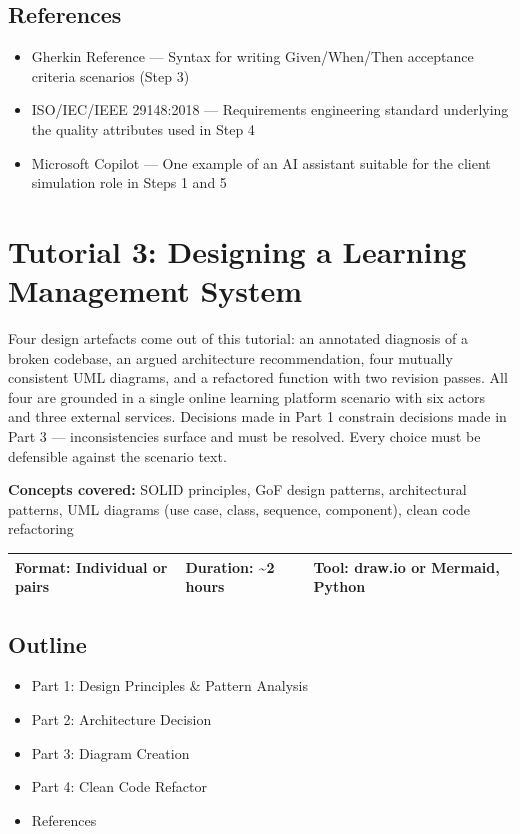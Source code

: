 \documentclass[11pt,a4paper]{book}
\begin{document}
\medskip

\section{References}

\begin{itemize}
  \item Gherkin Reference --- Syntax for writing Given/When/Then acceptance criteria scenarios (Step 3)
  \item ISO/IEC/IEEE 29148:2018 --- Requirements engineering standard underlying the quality attributes used in Step 4
  \item Microsoft Copilot --- One example of an AI assistant suitable for the client simulation role in Steps 1 and 5
\end{itemize}


\chapter{Tutorial 3: Designing a Learning Management System}

Four design artefacts come out of this tutorial: an annotated diagnosis of a broken codebase, an argued architecture recommendation, four mutually consistent UML diagrams, and a refactored function with two revision passes. All four are grounded in a single online learning platform scenario with six actors and three external services. Decisions made in Part 1 constrain decisions made in Part 3 --- inconsistencies surface and must be resolved. Every choice must be defensible against the scenario text.

\textbf{Concepts covered:} SOLID principles, GoF design patterns, architectural patterns, UML diagrams (use case, class, sequence, component), clean code refactoring

\begin{tabular}{lll}
\hline
\textbf{Format:} Individual or pairs & \textbf{Duration:} \textasciitilde{}2 hours & \textbf{Tool:} draw.io or Mermaid, Python \\
\hline
\end{tabular}

\medskip

\section{Outline}

\begin{itemize}
  \item Part 1: Design Principles \& Pattern Analysis
  \item Part 2: Architecture Decision
  \item Part 3: Diagram Creation
  \item Part 4: Clean Code Refactor
  \item References
\end{itemize}
\end{document}
